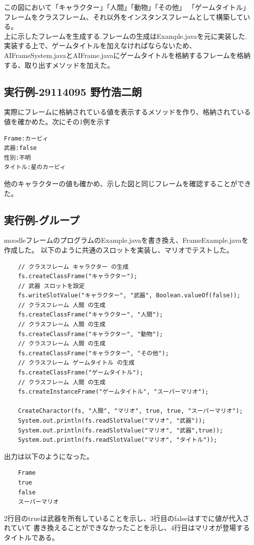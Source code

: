 \documentclass{jarticle}
\begin{document}
この図において「キャラクター」「人間」「動物」「その他」
「ゲームタイトル」フレームをクラスフレーム、それ以外をインスタンスフレームとして構築している。\\
上に示したフレームを生成する.フレームの生成はExample.javaを元に実装した.\\
実装する上で、ゲームタイトルを加えなければならないため、AIFrameSystem.javaとAIFrame.javaにゲームタイトルを格納するフレームを格納する、取り出すメソッドを加えた。
\subsection{実行例-29114095 野竹浩二朗}
実際にフレームに格納されている値を表示するメソッドを作り、格納されている値を確かめた。次にその1例を示す
\\
\begin{screen}
\begin{verbatim}
Frame:カービィ
武器:false
性別:不明
タイトル:星のカービィ
\end{verbatim}
\end{screen}
他のキャラクターの値も確かめ、示した図と同じフレームを確認することができた。

\subsection{実行例-グループ}
moodleフレームのプログラムのExample.javaを書き換え、FrameExample.javaを作成した。
以下のように共通のスロットを実装し、マリオでテストした。
\begin{lstlisting}
    // クラスフレーム キャラクター の生成
    fs.createClassFrame("キャラクター");
    // 武器 スロットを設定
    fs.writeSlotValue("キャラクター", "武器", Boolean.valueOf(false));
    // クラスフレーム 人間 の生成
    fs.createClassFrame("キャラクター", "人間");
    // クラスフレーム 人間 の生成
    fs.createClassFrame("キャラクター", "動物");
    // クラスフレーム 人間 の生成
    fs.createClassFrame("キャラクター", "その他");
    // クラスフレーム ゲームタイトル の生成
    fs.createClassFrame("ゲームタイトル");
    // クラスフレーム 人間 の生成
    fs.createInstanceFrame("ゲームタイトル", "スーパーマリオ");

    CreateCharactor(fs, "人間", "マリオ", true, true, "スーパーマリオ");
    System.out.println(fs.readSlotValue("マリオ", "武器"));
    System.out.println(fs.readSlotValue("マリオ", "武器",true));
    System.out.println(fs.readSlotValue("マリオ", "タイトル"));
\end{lstlisting}
出力は以下のようになった。
\begin{lstlisting}
    Frame
    true
    false
    スーパーマリオ
\end{lstlisting}
2行目のtrueは武器を所有していることを示し、3行目のfalseはすでに値が代入されていて
書き換えることができなかったことを示し、4行目はマリオが登場するタイトルである。
\end{document}
